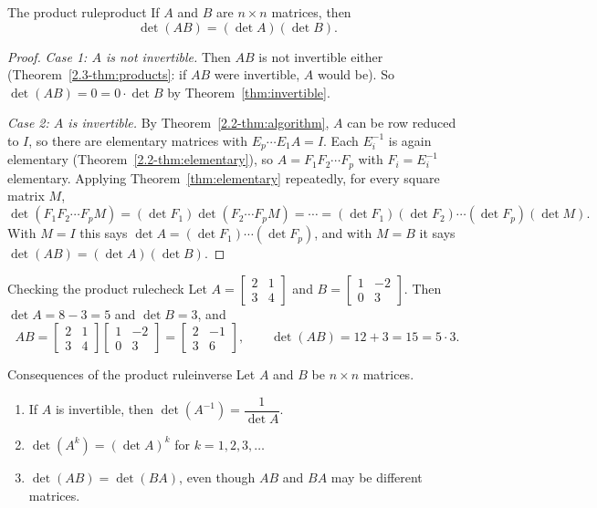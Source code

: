 \documentclass[11pt]{article}
\begin{document}
\begin{thm}{The product rule}{product}
If $A$ and $B$ are $n\times n$ matrices, then
\[
\det(AB)=(\det A)(\det B).
\]
\end{thm}

\begin{proof}
\emph{Case 1: $A$ is not invertible.} Then $AB$ is not invertible either (Theorem~\ref{2.3-thm:products}: if $AB$ were invertible, $A$ would be). So $\det(AB)=0=0\cdot\det B$ by Theorem~\ref{thm:invertible}.

\emph{Case 2: $A$ is invertible.} By Theorem~\ref{2.2-thm:algorithm}, $A$ can be row reduced to $I$, so there are elementary matrices with $E_p\cdots E_1A=I$. Each $E_i^{-1}$ is again elementary (Theorem~\ref{2.2-thm:elementary}), so $A=F_1F_2\cdots F_p$ with $F_i=E_i^{-1}$ elementary. Applying Theorem~\ref{thm:elementary} repeatedly, for every square matrix $M$,
\[
\det(F_1F_2\cdots F_pM)=(\det F_1)\det(F_2\cdots F_pM)=\cdots=(\det F_1)(\det F_2)\cdots(\det F_p)(\det M).
\]
With $M=I$ this says $\det A=(\det F_1)\cdots(\det F_p)$, and with $M=B$ it says $\det(AB)=(\det A)(\det B)$.
\end{proof}

\begin{exmp}{Checking the product rule}{check}
Let $A=\begin{bmatrix}2&1\\3&4\end{bmatrix}$ and $B=\begin{bmatrix}1&-2\\0&3\end{bmatrix}$. Then $\det A=8-3=5$ and $\det B=3$, and
\[
AB=\begin{bmatrix}2&1\\3&4\end{bmatrix}\begin{bmatrix}1&-2\\0&3\end{bmatrix}=\begin{bmatrix}2&-1\\3&6\end{bmatrix},\qquad\det(AB)=12+3=15=5\cdot3.
\]
\end{exmp}

\begin{thm}{Consequences of the product rule}{inverse}
Let $A$ and $B$ be $n\times n$ matrices.
\begin{enumerate}
  \item[(a)] If $A$ is invertible, then $\det(A^{-1})=\dfrac{1}{\det A}$.
  \item[(b)] $\det(A^k)=(\det A)^k$ for $k=1,2,3,\dots$
  \item[(c)] $\det(AB)=\det(BA)$, even though $AB$ and $BA$ may be different matrices.
\end{enumerate}
\end{thm}
\end{document}

